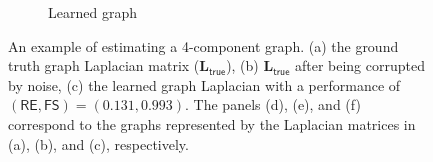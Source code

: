 \documentclass{article}
\begin{document}
\begin{figure}[!htb]
\begin{subfigure}[b]{0.3\textwidth}
            \caption{Learned graph}
    \end{subfigure}
        \caption{An example of estimating a 4-component graph. (a) the ground truth graph Laplacian matrix ($\mathbf{L}_{\mathsf{true}}$),
                 (b) $\mathbf{L}_{\mathsf{true}}$ after being corrupted by noise, (c) the learned graph Laplacian with a performance of
                 $(\mathsf{RE}, \mathsf{FS}) = (0.131, 0.993)$.
                 The panels (d), (e), and (f) correspond to the graphs represented by the Laplacian matrices in
                 (a), (b), and (c), respectively.}\label{fig:4-comp-graph}
        \label{fig:4-comp}
\end{figure}
\end{document}

